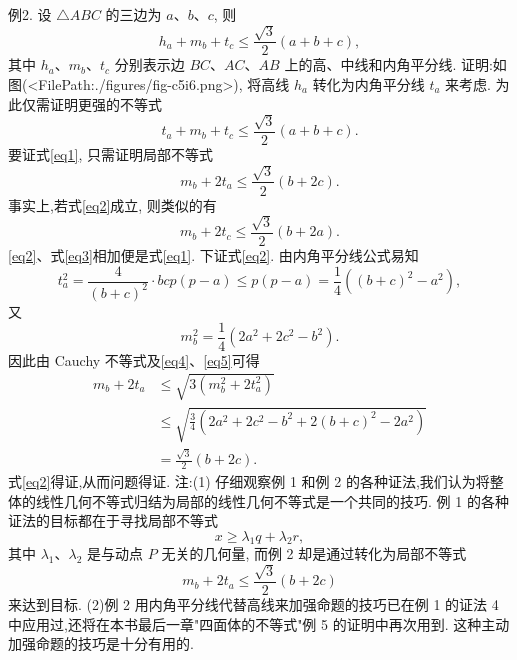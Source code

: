例2. 设 $\triangle A B C$ 的三边为 $a 、 b 、 c$, 则
$$
h_a+m_b+t_c \leqslant \frac{\sqrt{3}}{2}(a+b+c),
$$
其中 $h_a 、 m_b 、 t_c$ 分别表示边 $B C 、 A C 、 A B$ 上的高、中线和内角平分线.
证明:如图(<FilePath:./figures/fig-c5i6.png>), 将高线 $h_a$ 转化为内角平分线 $t_a$ 来考虑.
为此仅需证明更强的不等式
$$
t_a+m_b+t_c \leqslant \frac{\sqrt{3}}{2}(a+b+c) . \label{eq1}
$$
要证式\ref{eq1}, 只需证明局部不等式
$$
m_b+2 t_a \leqslant \frac{\sqrt{3}}{2}(b+2 c) . \label{eq2}
$$
事实上,若式\ref{eq2}成立, 则类似的有
$$
m_b+2 t_c \leqslant \frac{\sqrt{3}}{2}(b+2 a) . \label{eq3}
$$
\ref{eq2}、式\ref{eq3}相加便是式\ref{eq1}.
下证式\ref{eq2}.
由内角平分线公式易知
$$
t_a^2=\frac{4}{(b+c)^2} \cdot b c p(p-a) \leqslant p(p-a)=\frac{1}{4}\left((b+c)^2-a^2\right), \label{eq4}
$$
又
$$
m_b^2=\frac{1}{4}\left(2 a^2+2 c^2-b^2\right) . \label{eq5}
$$
因此由 Cauchy 不等式及\ref{eq4}、\ref{eq5}可得
$$
\begin{aligned}
m_b+2 t_a & \leqslant \sqrt{3\left(m_b^2+2 t_a^2\right)} \\
& \leqslant \sqrt{\frac{3}{4}\left(2 a^2+2 c^2-b^2+2(b+c)^2-2 a^2\right)} \\
& =\frac{\sqrt{3}}{2}(b+2 c) .
\end{aligned}
$$
式\ref{eq2}得证,从而问题得证.
注:(1) 仔细观察例 1 和例 2 的各种证法,我们认为将整体的线性几何不等式归结为局部的线性几何不等式是一个共同的技巧.
例 1 的各种证法的目标都在于寻找局部不等式
$$
x \geqslant \lambda_1 q+\lambda_2 r,
$$
其中 $\lambda_1 、 \lambda_2$ 是与动点 $P$ 无关的几何量, 而例 2 却是通过转化为局部不等式
$$
m_b+2 t_a \leqslant \frac{\sqrt{3}}{2}(b+2 c)
$$
来达到目标.
(2)例 2 用内角平分线代替高线来加强命题的技巧已在例 1 的证法 4 中应用过,还将在本书最后一章"四面体的不等式"例 5 的证明中再次用到.
这种主动加强命题的技巧是十分有用的.



